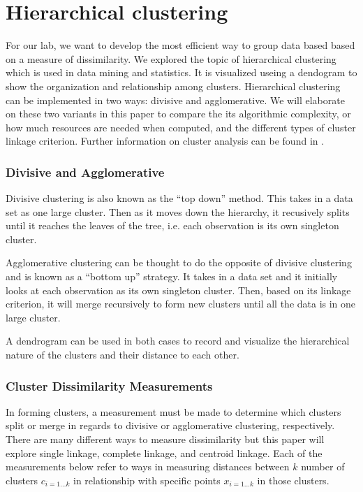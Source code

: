\documentclass[../tech_report_1.tex]{subfiles}
\begin{document}
\part{Hierarchical clustering}

For our lab, we want to develop the most efficient way to group data
based based on a measure of dissimilarity. We explored the topic of
hierarchical clustering which is used in data mining and statistics.
It is visualized useing a dendogram to show the organization and relationship
among clusters. Hierarchical clustering can be implemented in two
ways: divisive and agglomerative. We will elaborate on these two variants
in this paper to compare the its algorithmic complexity, or how much
resources are needed when computed, and the different types of cluster
linkage criterion. Further information on cluster analysis can be
found in \cite{ClusterAnalysis}.

\section{Divisive and Agglomerative}

Divisive clustering is also known as the ``top down'' method. This takes
in a data set as one large cluster. Then as it moves down the hierarchy,
it recusively splits until it reaches the leaves of the tree, i.e. each
observation is its own singleton cluster.

Agglomerative clustering can be thought to do the opposite of divisive
clustering and is known as a ``bottom up'' strategy. It takes in
a data set and it initially looks at each observation as its own singleton
cluster. Then, based on its linkage criterion, it will merge recursively
to form new clusters until all the data is in one large cluster.

A dendrogram can be used in both cases to record and visualize the hierarchical nature of the
clusters and their distance to each other.


\section{Cluster Dissimilarity Measurements}

In forming clusters, a measurement must be made to determine which
clusters split or merge in regards to divisive or agglomerative clustering,
respectively. There are many different ways to measure dissimilarity
but this paper will explore single linkage, complete linkage, and
centroid linkage. Each of the measurements below refer to ways in
measuring distances between $k$ number of clusters $c_{i=1\dots k}$
in relationship with specific points $x_{i=1\dots k}$ in those clusters.
\end{document}
